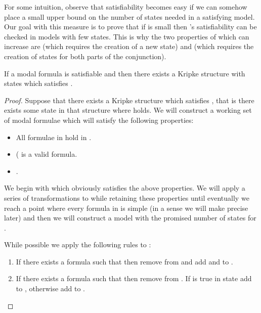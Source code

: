 \documentclass{llncs}
\begin{document}
For some intuition, observe that satisfiability becomes easy if we can somehow
place a small upper bound on the number of states needed in a satisfying model.
Our goal with this measure is to prove that if  is small then
's satisfiability can be checked in models with few states. This is why
the two properties of  which can increase  are 
(which requires the creation of a new state) and  (which requires the
creation of states for both parts of the conjunction).


\begin{theorem}

If a modal formula  is satisfiable and  then there exists
a Kripke structure with  states which satisfies .

\end{theorem}

\begin{proof}

Suppose that there exists a Kripke structure which satisfies , that is
there exists some state  in that structure where  holds. We will
construct a working set of modal formulae  which will satisfy the following
properties:

\begin{itemize}

\item All formulae in  hold in .

\item ( is a valid formula.

\item .

\end{itemize}

We begin with  which obviously satisfies the above properties. We
will apply a series of transformations to  while retaining these properties
until eventually we reach a point where every formula in  is simple (in a
sense we will make precise later) and then we will construct a model with the
promised number of states for .

While possible we apply the following rules to :

\begin{enumerate}

\item If there exists a formula  such that  then remove  from  and add  and 
to .

\item If there exists a formula  such that  then remove  from . If  is true
in state  add  to , otherwise add  to .


\end{enumerate}
\end{proof}
\end{document}
